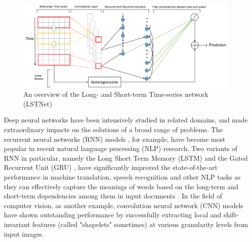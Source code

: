     \begin{figure}[!t]
    	\centering
        \includegraphics[width=\textwidth]{fig/overview.pdf}
        \caption{An overview of the Long- and Short-term Time-series network (LSTNet)}
        \label{fig:overview}
	\end{figure}   
    
    Deep neural networks have been intensively studied in related domains, and made extraordinary impacts on the solutions of a broad range of problems.  The recurrent neural networks (RNN) models \cite{elman1990finding}, for example, have become most popular in recent natural language processing (NLP) research.
Two variants of RNN in particular, namely the Long Short Term Memory (LSTM) \cite{hochreiter1997long} and the Gated Recurrent Unit (GRU) \cite{chung2014empirical}, have significantly improved the state-of-the-art performance in machine translation, speech recognition and other NLP tasks as they can effectively capture the  meanings of words based on the long-term and short-term dependencies among them in input documents  \cite{bahdanau2014neural,hinton2012deep,krizhevsky2012imagenet}.%
 In the field of computer vision, as another example, convolution neural network (CNN) models \cite{lecun1995convolutional, krizhevsky2012imagenet} have shown outstanding performance by successfully extracting local and shift-invariant features (called "shapelets" sometimes) at various granularity levels from input images.
    
